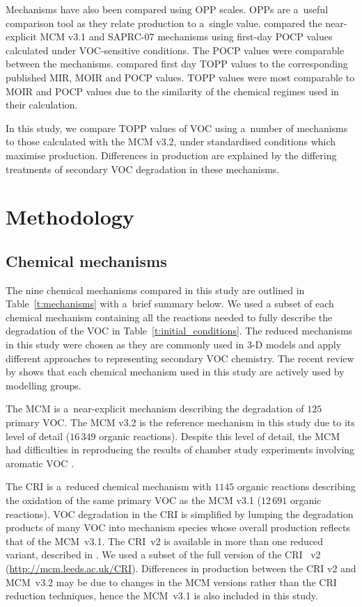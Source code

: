 \documentclass[acpd, online, hvmath]{copernicus}
\begin{document}
Mechanisms have also been compared using OPP scales.  OPPs are
a~useful comparison tool as they relate  production to
a~single value.  \citet{Derwent:2010} compared the near-explicit MCM
v3.1 and SAPRC-07 mechanisms using first-day POCP values calculated
under VOC-sensitive conditions.  The POCP values were comparable
between the mechanisms.  \citet{Butler:2011} compared first day TOPP
values to the corresponding published MIR, MOIR and POCP values.  TOPP
values were most comparable to MOIR and POCP values due to the
similarity of the chemical regimes used in their calculation.

In this study, we compare TOPP values of VOC using a~number of
mechanisms to those calculated with the MCM v3.2, under standardised
conditions which maximise  production.  Differences in
 production are explained by the differing treatments of
secondary VOC degradation in these mechanisms.


\section{Methodology}
\label{s:methodology}


\subsection{Chemical mechanisms}
\label{ss:mechanisms}

The nine chemical mechanisms compared in this study are outlined in
Table~\ref{t:mechanisms} with a~brief summary below.  We used a subset of each chemical mechanism containing all the reactions needed to fully describe the degradation of the VOC in Table~\ref{t:initial_conditions}.  The reduced
mechanisms in this study were chosen as they are commonly used in 3-D
models and apply different approaches to representing secondary VOC
chemistry. The recent review by \citet{Baklanov:2014} shows that each chemical mechanism used in this study are actively used by modelling groups.  

The MCM \citep{Jenkin:1997, Jenkin:2003, Saunders:2003, Bloss:2005,
  MCM_Site} is a~near-explicit mechanism describing the degradation of
$125$ primary VOC.  The MCM v3.2 is the reference mechanism in this
study due to its level of detail ($16\,349$ organic reactions). Despite this level of detail, the MCM had difficulties in reproducing the results of chamber study experiments involving aromatic VOC \citep{Bloss:2005}.

The CRI \citep{Jenkin:2008} is a~reduced chemical mechanism with $1145$ organic reactions describing
the oxidation of the same primary VOC as the MCM v3.1 ($12\,691$ organic reactions).  VOC
degradation in the CRI is simplified by lumping the degradation
products of many VOC into mechanism species whose overall 
production reflects that of the MCM~v3.1.  The CRI~v2 is available in
more than one reduced variant, described in \citet{Watson:2008}. We used a
subset of the full version of the CRI~ v2 (\url{http://mcm.leeds.ac.uk/CRI}).
Differences in  production between the CRI v2 and MCM~v3.2
may be due to changes in the MCM versions rather than the CRI
reduction techniques, hence the MCM~v3.1 is also included in this
study.
\end{document}
